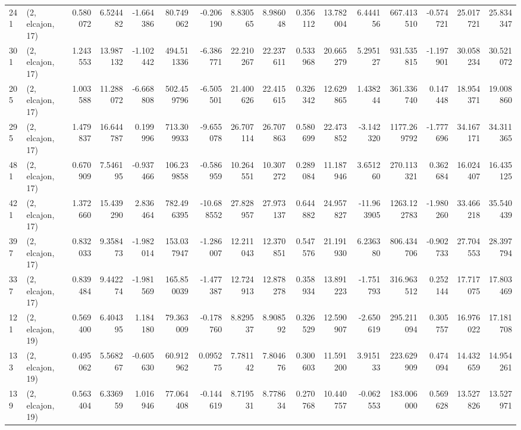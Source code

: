 \begin{tabular}{llrrrrrrrrrrrrrr}
241 &  (2, elcajon, 17) &   0.580072 &   6.524482 &  -1.664386 &    80.749062 &  -0.206190 &   8.830565 &   8.986048 &  0.356112 &  13.782004 &   6.444156 &   667.413510 &  -0.574721 &  25.017721 &  25.834347 \\
301 &  (2, elcajon, 17) &   1.243553 &  13.987132 &  -1.102442 &   494.511336 &  -6.386771 &  22.210267 &  22.237611 &  0.533968 &  20.665279 &   5.295127 &   931.535815 &  -1.197901 &  30.058234 &  30.521072 \\
205 &  (2, elcajon, 17) &   1.003588 &  11.288072 &  -6.668808 &   502.459796 &  -6.505501 &  21.400626 &  22.415615 &  0.326342 &  12.629865 &   1.438244 &   361.336740 &   0.147448 &  18.954371 &  19.008860 \\
295 &  (2, elcajon, 17) &   1.479837 &  16.644787 &   0.199996 &   713.309933 &  -9.655078 &  26.707114 &  26.707863 &  0.580699 &  22.473852 &  -3.142320 &  1177.269792 &  -1.777696 &  34.167171 &  34.311365 \\
481 &  (2, elcajon, 17) &   0.670909 &   7.546195 &  -0.937466 &   106.239858 &  -0.586959 &  10.264551 &  10.307272 &  0.289084 &  11.187946 &   3.651260 &   270.113321 &   0.362684 &  16.024407 &  16.435125 \\
421 &  (2, elcajon, 17) &   1.372660 &  15.439290 &   2.836464 &   782.496395 & -10.688552 &  27.828957 &  27.973137 &  0.644882 &  24.957827 & -11.963905 &  1263.122783 &  -1.980260 &  33.466218 &  35.540439 \\
397 &  (2, elcajon, 17) &   0.832033 &   9.358473 &  -1.982014 &   153.037947 &  -1.286007 &  12.211043 &  12.370851 &  0.547576 &  21.191930 &   6.236380 &   806.434706 &  -0.902733 &  27.704553 &  28.397794 \\
337 &  (2, elcajon, 17) &   0.839484 &   9.442274 &  -1.981569 &   165.850039 &  -1.477387 &  12.724913 &  12.878278 &  0.358934 &  13.891223 &  -1.751793 &   316.963512 &   0.252144 &  17.717075 &  17.803469 \\
121 &  (2, elcajon, 19) &   0.569400 &   6.404395 &   1.184180 &    79.363009 &  -0.178760 &   8.829537 &   8.908592 &  0.326529 &  12.590907 &  -2.650619 &   295.211094 &   0.305757 &  16.976022 &  17.181708 \\
133 &  (2, elcajon, 19) &   0.495062 &   5.568267 &  -0.605630 &    60.912962 &   0.095275 &   7.781142 &   7.804676 &  0.300603 &  11.591200 &   3.915133 &   223.629909 &   0.474094 &  14.432659 &  14.954261 \\
139 &  (2, elcajon, 19) &   0.563404 &   6.336959 &   1.016946 &    77.064408 &  -0.144619 &   8.719531 &   8.778634 &  0.270768 &  10.440757 &  -0.062553 &   183.006000 &   0.569628 &  13.527826 &  13.527971 \\

\end{tabular}
